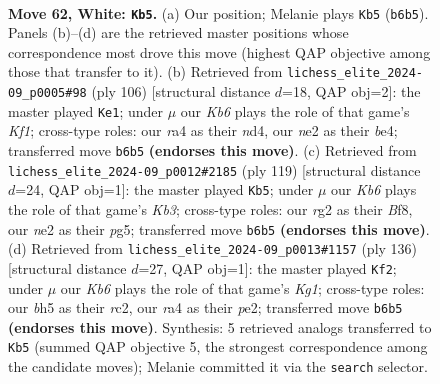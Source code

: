 \documentclass[11pt]{article}
\begin{document}
\clearpage

\begin{figure}[p]\centering
\begin{subfigure}{0.46\textwidth}\centering
\resizebox{\linewidth}{!}{%
\newchessgame
\chessboard[
  setfen={8/7p/1K2k3/4p2b/rp6/8/4n1r1/8 w - - 14 62},
  showmover=false,
  pgfstyle=straightmove, color=movearrow, markmove={b6-b5}
]}
\caption{}
\end{subfigure}\hfill
\begin{subfigure}{0.46\textwidth}\centering
\resizebox{\linewidth}{!}{%
\newchessgame
\chessboard[
  setfen={8/4k2p/6p1/4p3/3nb1r1/8/8/5K2 w - - 0 54},
  showmover=false,
  pgfstyle=straightmove, color=movearrow, markmove={f1-e1}
]}
\caption{}
\end{subfigure}
\\[4pt]
\begin{subfigure}{0.46\textwidth}\centering
\resizebox{\linewidth}{!}{%
\newchessgame
\chessboard[
  setfen={5b2/8/1k6/6P1/2R1NP2/3K4/8/8 b - - 4 60},
  showmover=false,
  pgfstyle=straightmove, color=movearrow, markmove={b6-b5}
]}
\caption{}
\end{subfigure}\hfill
\begin{subfigure}{0.46\textwidth}\centering
\resizebox{\linewidth}{!}{%
\newchessgame
\chessboard[
  setfen={8/8/4p3/8/5k2/2p5/2r1p3/6K1 w - - 0 69},
  showmover=false,
  pgfstyle=straightmove, color=movearrow, markmove={g1-f2}
]}
\caption{}
\end{subfigure}
\caption{\textbf{Move 62, White: \texttt{Kb5}.} (a) Our position; Melanie plays \texttt{Kb5} (\texttt{b6b5}). Panels (b)--(d) are the retrieved master positions whose correspondence most drove this move (highest QAP objective among those that transfer to it). (b) Retrieved from \texttt{lichess\_elite\_2024-09\_p0005\#98} (ply 106) [structural distance $d$=18, QAP obj=2]: the master played \texttt{Ke1}; under $\mu$ our \emph{Kb6} plays the role of that game's \emph{Kf1}; cross-type roles: our \emph{r}a4 as their \emph{n}d4, our \emph{n}e2 as their \emph{b}e4; transferred move \texttt{b6b5} \textbf{(endorses this move)}. (c) Retrieved from \texttt{lichess\_elite\_2024-09\_p0012\#2185} (ply 119) [structural distance $d$=24, QAP obj=1]: the master played \texttt{Kb5}; under $\mu$ our \emph{Kb6} plays the role of that game's \emph{Kb3}; cross-type roles: our \emph{r}g2 as their \emph{B}f8, our \emph{n}e2 as their \emph{p}g5; transferred move \texttt{b6b5} \textbf{(endorses this move)}. (d) Retrieved from \texttt{lichess\_elite\_2024-09\_p0013\#1157} (ply 136) [structural distance $d$=27, QAP obj=1]: the master played \texttt{Kf2}; under $\mu$ our \emph{Kb6} plays the role of that game's \emph{Kg1}; cross-type roles: our \emph{b}h5 as their \emph{r}c2, our \emph{r}a4 as their \emph{p}e2; transferred move \texttt{b6b5} \textbf{(endorses this move)}. Synthesis: 5 retrieved analogs transferred to \texttt{Kb5} (summed QAP objective 5, the strongest correspondence among the candidate moves); Melanie committed it via the \texttt{search} selector.}
\label{fig:thought-m122}
\end{figure}
\end{document}
